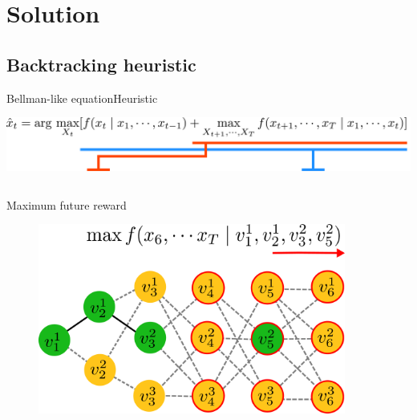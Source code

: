 \section{Solution}

\subsection{Backtracking heuristic}

\begin{frame}{Bellman-like equation}{Heuristic}


\centering
\includegraphics[width = \textwidth]{./figure/arg_equation}

\begin{columns}
\begin{block}{Maximum future reward}
\begin{figure}
\centering
\includegraphics[width = 0.9\textwidth]{./figure/DefineFuncH}
\end{figure}
\end{block}


\end{columns}
\end{frame}
